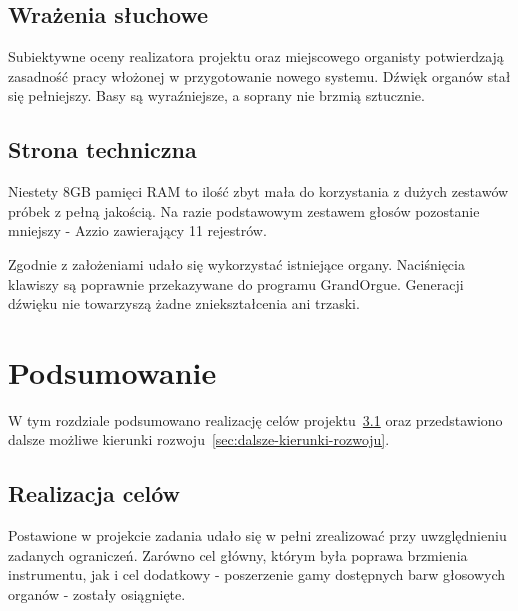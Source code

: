 \documentclass[11pt]{report}
\begin{document}
    \section{Wrażenia słuchowe}\label{sec:wrażenia-słuchowe}
    Subiektywne oceny realizatora projektu oraz miejscowego organisty potwierdzają zasadność pracy włożonej w przygotowanie nowego systemu.
    Dźwięk organów stał się pełniejszy.
    Basy są wyraźniejsze, a soprany nie brzmią sztucznie.


    \section{Strona techniczna}\label{sec:strona-techniczna}
    Niestety 8GB pamięci RAM to ilość zbyt mała do korzystania z dużych zestawów próbek z pełną jakością.
    Na razie podstawowym zestawem głosów pozostanie mniejszy - Azzio zawierający 11 rejestrów.

    Zgodnie z założeniami udało się wykorzystać istniejące organy.
    Naciśnięcia klawiszy są poprawnie przekazywane do programu GrandOrgue.
    Generacji dźwięku nie towarzyszą żadne zniekształcenia ani trzaski.


    \chapter{Podsumowanie}
    W tym rozdziale podsumowano realizację celów projektu~\ref{sec:realizacja-celów} oraz przedstawiono dalsze możliwe kierunki rozwoju~\ref{sec:dalsze-kierunki-rozwoju}.


    \section{Realizacja celów}\label{sec:realizacja-celów}
    Postawione w projekcie zadania udało się w pełni zrealizować przy uwzględnieniu zadanych ograniczeń.
    Zarówno cel główny, którym była poprawa brzmienia instrumentu, jak i cel dodatkowy - poszerzenie gamy dostępnych barw głosowych organów - zostały osiągnięte.
\end{document}
